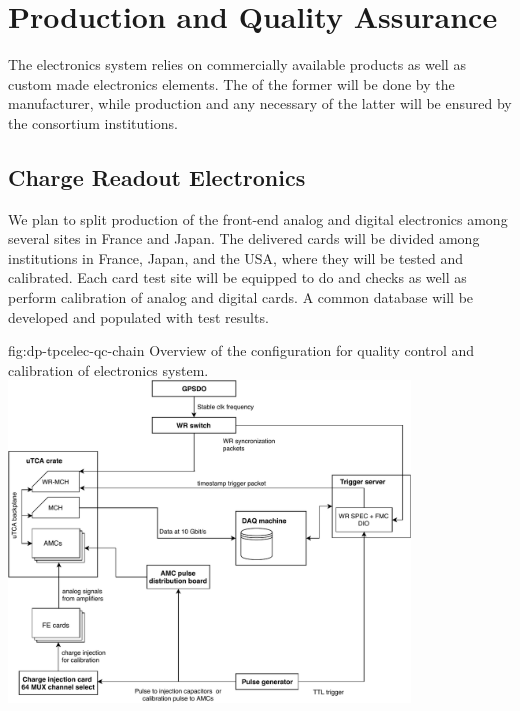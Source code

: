 \section{Production and Quality Assurance}
\label{sec:dp-tpcelec-production}

The   electronics system relies on commercially available products as well as custom made electronics elements. The  of the former will be done by the manufacturer, while production and any necessary  of the latter will be ensured by the consortium institutions. 


\subsection{Charge Readout Electronics}
\label{ssec:dp-tpcelec-prod-cro}

We plan to split production of the front-end analog and digital electronics among several sites in France and Japan. The delivered cards will be divided among institutions in France, Japan, and the USA, where they will be tested and calibrated. Each card test site will be equipped to do  and  checks as well as perform calibration of analog and digital cards. A common database will be developed and populated with test results. 

\begin{dunefigure}{fig:dp-tpcelec-qc-chain}
{Overview of the configuration for quality control and calibration of  electronics system.}
\includegraphics[width=0.8\textwidth]{graphics/dp-tpcelec-qc-chain}
\end{dunefigure}



